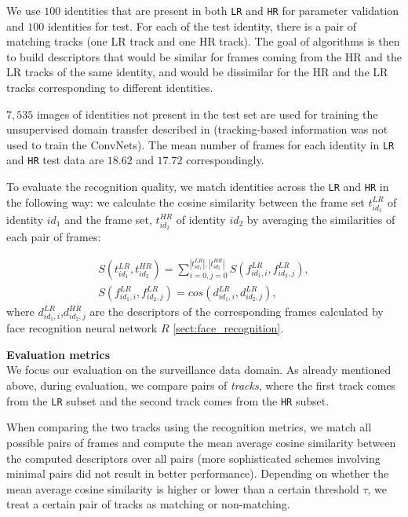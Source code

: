 We use $100$ identities that are present in both \texttt{LR} and \texttt{HR} for parameter validation and $100$ identities for test. For each of the test identity, there is a pair of matching tracks (one LR track and one HR track). The goal of algorithms is then to build descriptors that would be similar for frames coming from the HR and the LR tracks of the same identity, and would be dissimilar for the HR and the LR tracks corresponding to different identities.

$7,535$ images of identities not present in the test set are used for training the unsupervised domain transfer described in  (tracking-based information was not used to train the ConvNets). The mean number of frames for each identity in \texttt{LR} and \texttt{HR} test data are $18.62$ and $17.72$ correspondingly.
 
 To evaluate the recognition quality, we match identities across the \texttt{LR} and \texttt{HR} in the following way: we calculate the cosine similarity between the frame set $t_{id_1}^{LR}$ of identity $id_1$ and the frame set, $t_{id_2}^{HR}$ of identity $id_2$ by averaging the similarities of each pair of frames: 

 \begin{align}
     S(t_{id_1}^{LR},t_{id_2}^{HR}) = \sum_{i=0, j= 0}^{|t_{id_1}^{LR}|, |t_{id_2}^{HR}|} S(f_{id_1,i}^{LR},f_{id_2,j}^{LR} ), \\
     S(f_{id_1,i}^{LR},f_{id_2,j}^{LR} ) =  cos(d_{id_1,i}^{LR},d_{id_2,j}^{LR}),
 \end{align}
 where $d_{id_1,i}^{LR}$,$d_{id_2,j}^{HR}$ are the descriptors of the corresponding frames calculated by face recognition neural network $R$ \ref{sect:face_recognition}.

\bigskip\indent\textbf{Evaluation metrics}\\
We focus our evaluation on the surveillance data domain. As already mentioned above, during evaluation, we compare pairs of \textit{tracks}, where the first track comes from the \texttt{LR} subset and the second track comes from the \texttt{HR} subset. 

When comparing the two tracks using the recognition metrics, we match all possible pairs of frames and compute the mean average cosine similarity between the computed descriptors over all pairs (more sophisticated schemes involving minimal pairs did not result in better performance). Depending on whether the mean average cosine similarity is higher or lower than a certain threshold $\tau$, we treat a certain pair of tracks as matching or non-matching.

